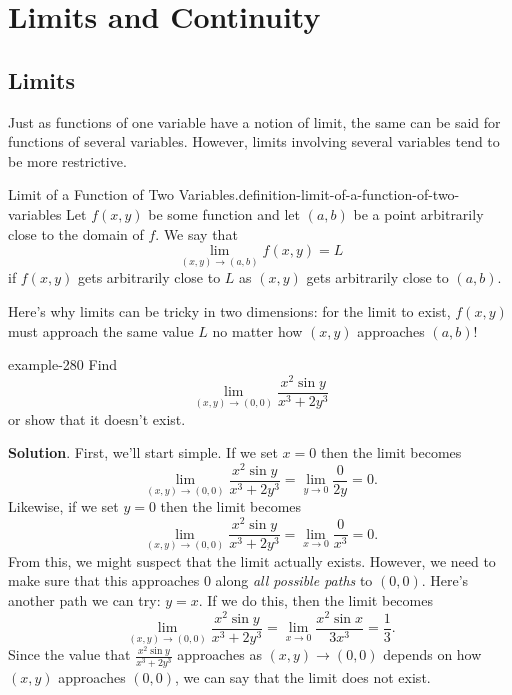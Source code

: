 \documentclass[10pt,]{book}
\numberwithin{equation}{section}
\begin{document}
\section[{Limits and Continuity}]{Limits and Continuity}\label{section-limits-and-continuity}
%
%
\typeout{************************************************}
\typeout{************************************************}
%
\subsection[{Limits}]{Limits}\label{subsection-limits}
\hypertarget{p-1340}{}%
Just as functions of one variable have a notion of limit, the same can be said for functions of several variables. However, limits involving several variables tend to be more restrictive.%
\begin{definition}{Limit of a Function of Two Variables.}{definition-limit-of-a-function-of-two-variables}%
\hypertarget{p-1341}{}%
Let \(f(x,y)\) be some function and let \((a,b)\) be a point arbitrarily close to the domain of \(f\). We say that%
\begin{equation*}
\lim_{(x,y)\to(a,b)}f(x,y) = L
\end{equation*}
if \(f(x,y)\) gets arbitrarily close to \(L\) as \((x,y)\) gets arbitrarily close to \((a,b)\).%
\end{definition}
\hypertarget{p-1342}{}%
Here's why limits can be tricky in two dimensions: for the limit to exist, \(f(x,y)\) must approach the same value \(L\) no matter how \((x,y)\) approaches \((a,b)\)!%
\begin{example}{}{example-280}%
\hypertarget{p-1343}{}%
Find%
\begin{equation*}
\lim_{(x,y)\to(0,0)}\frac{x^{2}\sin y}{x^{3}+2y^{3}}
\end{equation*}
or show that it doesn't exist.%
\par\smallskip%
\noindent\textbf{Solution}.\hypertarget{solution-214}{}\quad%
\hypertarget{p-1344}{}%
First, we'll start simple. If we set \(x = 0\) then the limit becomes%
\begin{equation*}
\lim_{(x,y)\to(0,0)}\frac{x^{2}\sin y}{x^{3}+2y^{3}} = \lim_{y\to0}\frac{0}{2y} = 0.
\end{equation*}
Likewise, if we set \(y=0\) then the limit becomes%
\begin{equation*}
\lim_{(x,y)\to(0,0)}\frac{x^{2}\sin y}{x^{3}+2y^{3}} = \lim_{x\to0}\frac{0}{x^{3}} = 0.
\end{equation*}
From this, we might suspect that the limit actually exists. However, we need to make sure that this approaches \(0\) along \emph{all possible paths} to \((0,0)\). Here's another path we can try: \(y = x\). If we do this, then the limit becomes%
\begin{equation*}
\lim_{(x,y)\to(0,0)}\frac{x^{2}\sin y}{x^{3}+2y^{3}} = \lim_{x\to0}\frac{x^{2}\sin x}{3x^{3}} = \frac{1}{3}.
\end{equation*}
Since the value that \(\frac{x^{2}\sin y}{x^{3}+2y^{3}}\) approaches as \((x,y)\to(0,0)\) depends on how \((x,y)\) approaches \((0,0)\), we can say that the limit does not exist.%
\end{example}
\end{document}
